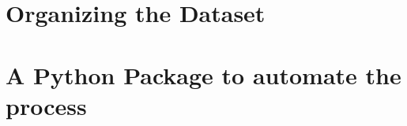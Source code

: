 \section{Organizing the Dataset}\label{s:ds-organizing}

\section{A Python Package to automate the process}\label{s:ds-package}